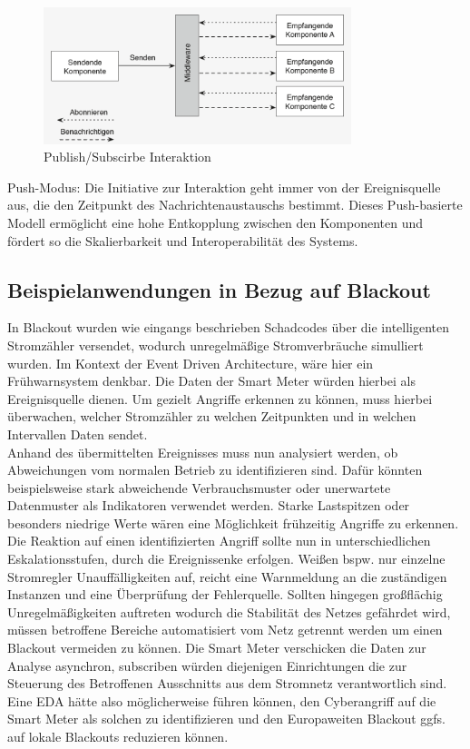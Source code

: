 \documentclass[a4paper,12pt]{article}
\begin{document}
\begin{figure}[h]
    \centering
    \includegraphics[width=0.8\textwidth]{images/Publish_Subscirbe.png}
    \caption{Publish/Subscirbe Interaktion \cite[S. 54]{Bruns2010}}
    \label{fig:PubSub}
\end{figure}
Push-Modus: Die Initiative zur Interaktion geht immer von der Ereignisquelle aus, die den Zeitpunkt des Nachrichtenaustauschs bestimmt. Dieses Push-basierte Modell ermöglicht eine hohe Entkopplung zwischen den Komponenten und fördert so die Skalierbarkeit und Interoperabilität des Systems. \cite [S. 53f]{Bruns2010}
\subsection{Beispielanwendungen in Bezug auf Blackout}
In Blackout wurden wie eingangs beschrieben Schadcodes über die intelligenten Stromzähler versendet, wodurch unregelmäßige Stromverbräuche simulliert wurden. Im Kontext der Event Driven Architecture, wäre hier ein Frühwarnsystem denkbar. Die Daten der Smart Meter würden hierbei als Ereignisquelle dienen. Um gezielt Angriffe erkennen zu können, muss hierbei überwachen, welcher Stromzähler zu welchen Zeitpunkten und in welchen Intervallen Daten sendet.\\
Anhand des übermittelten Ereignisses muss nun analysiert werden, ob Abweichungen vom normalen Betrieb zu identifizieren sind. Dafür könnten beispielsweise stark abweichende Verbrauchsmuster oder unerwartete Datenmuster als Indikatoren verwendet werden. Starke Lastspitzen oder besonders niedrige Werte wären eine Möglichkeit frühzeitig Angriffe zu erkennen.\\
Die Reaktion auf einen identifizierten Angriff sollte nun in unterschiedlichen Eskalationsstufen, durch die Ereignissenke erfolgen. Weißen bspw. nur einzelne Stromregler Unauffälligkeiten auf, reicht eine Warnmeldung an die zuständigen Instanzen und eine Überprüfung der Fehlerquelle. Sollten hingegen großflächig Unregelmäßigkeiten auftreten wodurch die Stabilität des Netzes gefährdet wird, müssen betroffene Bereiche automatisiert vom Netz getrennt werden um einen Blackout vermeiden zu können. Die Smart Meter verschicken die Daten zur Analyse asynchron, subscriben würden diejenigen Einrichtungen die zur Steuerung des Betroffenen Ausschnitts aus dem Stromnetz verantwortlich sind.\\
Eine EDA hätte also möglicherweise führen können, den Cyberangriff auf die Smart Meter als solchen zu identifizieren und den Europaweiten Blackout ggfs. auf lokale Blackouts reduzieren können.
\end{document}
